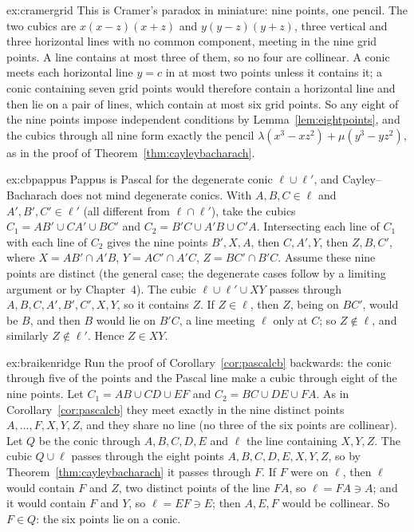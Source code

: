 \begin{solution}{ex:cramergrid}
\idea This is Cramer's paradox in miniature: nine points, one pencil.
\writeup The two cubics are $x(x-z)(x+z)$ and $y(y-z)(y+z)$, three vertical and three horizontal lines with no common component, meeting in the nine grid
points. A line contains at most three of them, so no four are collinear. A conic meets each horizontal line $y=c$ in at most two points unless it contains it; a
conic containing seven grid points would therefore contain a horizontal line and then lie on a pair of lines, which contain at most six grid points. So
any eight of the nine points impose independent conditions by Lemma~\ref{lem:eightpoints}, and the cubics through all nine form exactly the pencil
$\lambda(x^3-xz^2)+\mu(y^3-yz^2)$, as in the proof of Theorem~\ref{thm:cayleybacharach}.
\end{solution}

\begin{solution}{ex:cbpappus}
\idea Pappus is Pascal for the degenerate conic $\ell\cup\ell'$, and Cayley--Bacharach does not mind degenerate conics.
\writeup With $A,B,C\in\ell$ and $A',B',C'\in\ell'$ (all different from $\ell\cap\ell'$), take the cubics $C_1=AB'\cup CA'\cup BC'$ and $C_2=B'C\cup A'B\cup C'A$.
Intersecting each line of $C_1$ with each line of $C_2$ gives the nine points $B',X,A$, then $C,A',Y$, then $Z,B,C'$, where $X=AB'\cap A'B$, $Y=AC'\cap A'C$,
$Z=BC'\cap B'C$. Assume these nine points are distinct (the general case; the degenerate cases follow by a limiting argument or by Chapter~4). The cubic
$\ell\cup\ell'\cup XY$ passes through $A,B,C,A',B',C',X,Y$, so it contains $Z$. If $Z\in\ell$, then $Z$, being on $BC'$, would be $B$, and then $B$ would lie on
$B'C$, a line meeting $\ell$ only at $C$; so $Z\notin\ell$, and similarly $Z\notin\ell'$. Hence $Z\in XY$.
\end{solution}

\begin{solution}{ex:braikenridge}
\idea Run the proof of Corollary~\ref{cor:pascalcb} backwards: the conic through five of the points and the Pascal line make a cubic through eight of the nine points.
\writeup Let $C_1=AB\cup CD\cup EF$ and $C_2=BC\cup DE\cup FA$. As in Corollary~\ref{cor:pascalcb} they meet exactly in the nine distinct points
$A,\dots,F,X,Y,Z$, and they share no line (no three of the six points are collinear). Let $Q$ be the conic through $A,B,C,D,E$ and $\ell$ the line containing
$X,Y,Z$. The cubic $Q\cup\ell$ passes through the eight points $A,B,C,D,E,X,Y,Z$, so by Theorem~\ref{thm:cayleybacharach} it passes through $F$. If $F$ were on
$\ell$, then $\ell$ would contain $F$ and $Z$, two distinct points of the line $FA$, so $\ell=FA\ni A$; and it would contain $F$ and $Y$, so $\ell=EF\ni E$; then
$A,E,F$ would be collinear. So $F\in Q$: the six points lie on a conic.
\end{solution}

